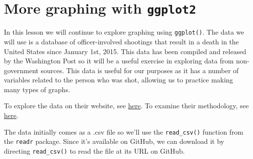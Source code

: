 \documentclass[
  12pt,
]{book}
\begin{document}
\hypertarget{ois_graphs}{%
\chapter{\texorpdfstring{More graphing with \texttt{ggplot2}}{More graphing with ggplot2}}\label{ois_graphs}}

In this lesson we will continue to explore graphing using \texttt{ggplot()}. The data we will use is a database of officer-involved shootings that result in a death in the United States since January 1st, 2015. This data has been compiled and released by the Washington Post so it will be a useful exercise in exploring data from non-government sources. This data is useful for our purposes as it has a number of variables related to the person who was shot, allowing us to practice making many types of graphs.

To explore the data on their website, see \href{https://www.washingtonpost.com/graphics/2019/national/police-shootings-2019/?utm_term=.e870afc9a00c}{here}.
To examine their methodology, see \href{https://www.washingtonpost.com/national/how-the-washington-post-is-examining-police-shootings-in-the-united-states/2016/07/07/d9c52238-43ad-11e6-8856-f26de2537a9d_story.html?utm_term=.f07e9800092b}{here}.

The data initially comes as a .csv file so we'll use the \texttt{read\_csv()} function from the \texttt{readr} package. Since it's available on GitHub, we can download it by directing \texttt{read\_csv()} to read the file at its URL on GitHub.
\end{document}

